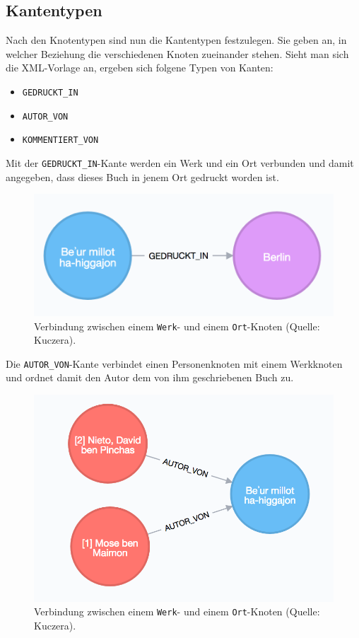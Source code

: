 \documentclass[12pt,ngerman,]{article}
\providecommand{\tightlist}{%
  \setlength{\itemsep}{0pt}\setlength{\parskip}{0pt}}
\begin{document}
\subsection{Kantentypen}\label{kantentypen}

Nach den Knotentypen sind nun die Kantentypen festzulegen. Sie geben an,
in welcher Beziehung die verschiedenen Knoten zueinander stehen. Sieht
man sich die XML-Vorlage an, ergeben sich folgene Typen von Kanten:

\begin{itemize}
\tightlist
\item
  \texttt{GEDRUCKT\_IN}
\item
  \texttt{AUTOR\_VON}
\item
  \texttt{KOMMENTIERT\_VON}
\end{itemize}

Mit der \texttt{GEDRUCKT\_IN}-Kante werden ein Werk und ein Ort
verbunden und damit angegeben, dass dieses Buch in jenem Ort gedruckt
worden ist.

\begin{figure}
\centering
\includegraphics{Bilder/Werk-Ort.png}
\caption{Verbindung zwischen einem \texttt{Werk}- und einem
\texttt{Ort}-Knoten (Quelle: Kuczera).}
\end{figure}

Die \texttt{AUTOR\_VON}-Kante verbindet einen Personenknoten mit einem
Werkknoten und ordnet damit den Autor dem von ihm geschriebenen Buch zu.

\begin{figure}
\centering
\includegraphics{Bilder/Werk-Autor.png}
\caption{Verbindung zwischen einem \texttt{Werk}- und einem
\texttt{Ort}-Knoten (Quelle: Kuczera).}
\end{figure}
\end{document}
